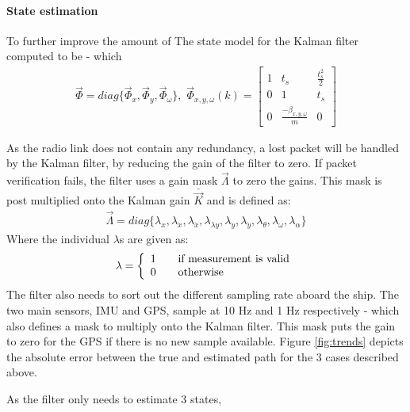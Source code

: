 \documentclass[a0,portrait]{a0poster}
\begin{document}
\begin{center}
{\paragraph{State estimation}
To further improve the amount of 
The state model for the Kalman filter computed to be - which 
\begin{align}
\vec{\Phi} = diag\{\vec{\Phi} _x,\vec{\Phi} _y,\vec{\Phi} _\omega\},\,\, \vec{\Phi}_{x,y,\omega}(k) = \begin{bmatrix}
1 & t_s & \frac{t_s^2}{2}\\
0 & 1 & t_s\\
0 & \frac{-\beta_{x,y,\omega}}{m} & 0
\end{bmatrix}
\end{align}

As the radio link does not contain any redundancy, a lost packet will be handled by the Kalman filter, by reducing the gain of the filter to zero. If packet verification fails, the filter uses a gain mask $\vec{\Lambda}$ to zero the gains. This mask is post multiplied onto the Kalman gain $\bar{\vec{K}}$ and is defined as:
\begin{align}
\vec{\Lambda} = diag\{\lambda_x,\lambda_{\dot{x}},\lambda_{\ddot{x}},\lambda_{\lambda{y}},\lambda_{\dot{y}},\lambda_{\ddot{y}},\lambda_{\theta},\lambda_{\omega},\lambda_{\alpha} \}
\end{align}
Where the individual $\lambda$s are given as:
\begin{align}
\lambda = 
\left\{
  \begin{array}{l l}
    1 & \quad \text{if measurement is valid}\\
    0 & \quad \text{otherwise}
  \end{array} \right.
\end{align} 
The filter also needs to sort out the different sampling rate aboard the ship. The two main sensors, IMU and GPS, sample at 10 Hz and 1 Hz respectively - which also defines a mask to multiply onto the Kalman filter. This mask puts the gain to zero for the GPS if there is no new sample available. Figure \ref{fig:trends} depicts the absolute error between the true and estimated path for the 3 cases described above.

As the filter only needs to estimate 3 states, 


}
\col{
}
\end{center}
\end{document}
